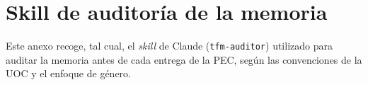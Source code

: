 \chapter{Skill de auditoría de la memoria}
\label{anx:skill-auditor}

Este anexo recoge, tal cual, el \emph{skill} de Claude (\texttt{tfm-auditor}) utilizado para auditar la memoria antes de cada entrega de la PEC, según las convenciones de la UOC y el enfoque de género.
\\


